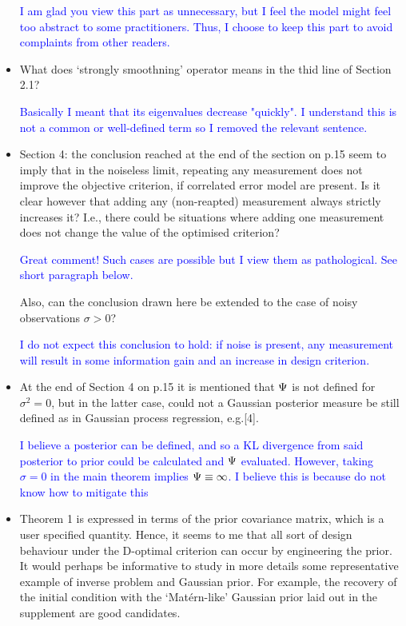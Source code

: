 \documentclass{amsart}
\newcommand{\answer}[1]{\vskip 0.05in \textcolor{blue}{#1} \vskip 0.05in}
\begin{document}
\begin{itemize}
  \answer{I am glad you view this part as unnecessary, but I feel the
  model might feel too abstract to some practitioners. Thus, I choose
  to keep this part to avoid complaints from other readers.}


\item What does ‘strongly smoothning’ operator means in the thid line of Section 2.1?

  \answer{Basically I meant that its eigenvalues decrease
    "quickly". I understand this is not a common or well-defined term
    so I removed the relevant sentence.}
  
\item Section 4: the conclusion reached at the end of the section on
  p.15 seem to imply that in the noiseless limit, repeating any
  measurement does not improve the objective criterion, if correlated
  error model are present. Is it clear however that adding any
  (non-reapted) measurement always strictly increases it? I.e., there
  could be situations where adding one measurement does not change the
  value of the optimised criterion?

  \answer{Great comment! Such cases are possible but I view them as
  pathological. See short paragraph below.}


  Also, can the conclusion drawn here be extended to the
  case of noisy observations $\sigma > 0$?

  \answer{I do not expect this conclusion to hold: if noise is
  present, any measurement will result in some information gain and an
  increase in design criterion.}

  
\item At the end of Section 4 on p.15 it is mentioned that $\Psi$ is not
  defined for $\sigma^2= 0$, but in the latter case, could not a Gaussian
  posterior measure be still defined as in Gaussian process
  regression, e.g.[4].

  \answer{I believe a posterior can be defined, and so a KL
  divergence from said posterior to prior could be calculated and
  $\Psi$ evaluated. However, taking $\sigma = 0$ in the main theorem
  implies $\Psi \equiv \infty$. I believe this is because do not know
  how to mitigate this}
  
\item Theorem 1 is expressed in terms of the prior covariance matrix,
  which is a user specified quantity. Hence, it seems to me that all
  sort of design behaviour under the D-optimal criterion can occur by
  engineering the prior. It would perhaps be informative to study in
  more details some representative example of inverse problem and
  Gaussian prior. For example, the recovery of the initial condition
  with the ‘Matérn-like’ Gaussian prior laid out in the supplement are
  good candidates.


\end{itemize}
\end{document}
